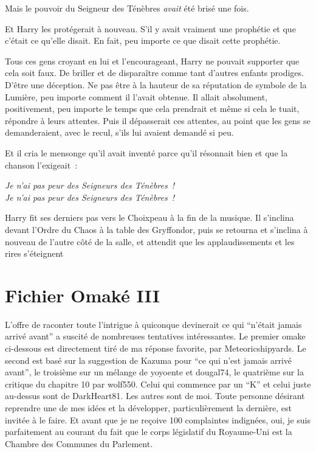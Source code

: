 Mais le pouvoir du Seigneur des Ténèbres \emph{avait} été brisé une fois.

Et Harry les protégerait à nouveau. S'il y avait vraiment une prophétie et que c'était ce qu'elle disait. En fait, peu importe ce que disait cette prophétie.

Tous ces gens croyant en lui et l'encourageant, Harry ne pouvait supporter que cela soit faux. De briller et de disparaître comme tant d'autres enfants prodiges. D'être une déception. Ne pas être à la hauteur de sa réputation de symbole de la Lumière, peu importe comment il l'avait obtenue. Il allait absolument, positivement, peu importe le temps que cela prendrait et même si cela le tuait, répondre à leurs attentes. Puis il dépasserait ces attentes, au point que les gens se demanderaient, avec le recul, s'ils lui avaient demandé si peu.

Et il cria le mensonge qu'il avait inventé parce qu'il résonnait bien et que la chanson l'exigeait~:

\begin{center}
\emph{Je n'ai pas peur des Seigneurs des Ténèbres~!}\\
\emph{Je n'ai pas peur des Seigneurs des Ténèbres~!}
\end{center}

Harry fit ses derniers pas vers le Choixpeau à la fin de la musique. Il s'inclina devant l'Ordre du Chaos à la table des Gryffondor, puis se retourna et s'inclina à nouveau de l'autre côté de la salle, et attendit que les applaudissements et les rires s'éteignent~

\section{Fichier Omaké III}

L'offre de raconter toute l'intrigue à quiconque devinerait ce qui “n'était jamais arrivé avant” a suscité de nombreuses tentatives intéressantes. Le premier omake ci-dessous est directement tiré de ma réponse favorite, par Meteoricshipyards. Le second est basé sur la suggestion de Kazuma pour “ce qui n'est jamais arrivé avant”, le troisième sur un mélange de yoyoente et dougal74, le quatrième sur la critique du chapitre 10 par wolf550. Celui qui commence par un “K” et celui juste au-dessus sont de DarkHeart81. Les autres sont de moi. Toute personne désirant reprendre une de mes idées et la développer, particulièrement la dernière, est invitée à le faire. Et avant que je ne reçoive 100 complaintes indignées, oui, je suis parfaitement au courant du fait que le corps législatif du Royaume-Uni est la Chambre des Communes du Parlement.

